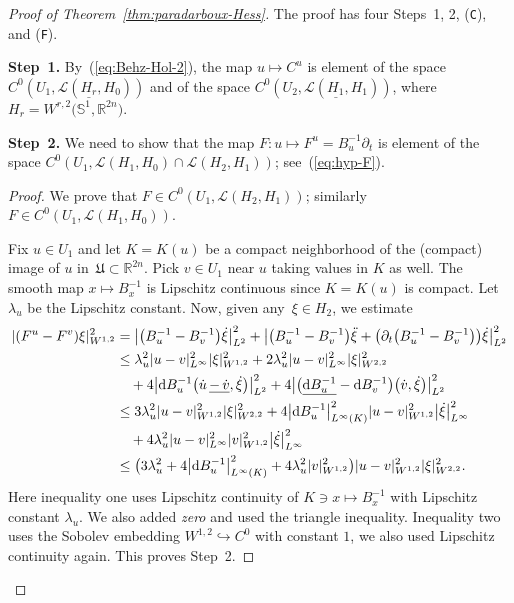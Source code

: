 \documentclass[pdftex]{sigma}
\numberwithin{equation}{section}
\newcommand{\R}{{\mathbb{R}}}
\renewcommand{\SS}{{\mathbb{S}}}
\newcommand{\Ll}{{\mathcal{L}}} %
\def\abs#1{\mathopen|#1\mathclose|}
\newcommand{\p}{{\partial}}
\newcommand{\INTO}{\hookrightarrow} %
\newcommand{\1}{{{\mathchoice {\rm 1\mskip-4mu l} {\rm 1\mskip-4mu l}
{\rm 1\mskip-4.5mu l} {\rm 1\mskip-5mu l}}}}
\begin{document}
\begin{proof}[Proof of Theorem~\ref{thm:paradarboux-Hess}]
The proof has four Steps~1, 2, (\texttt{C}), and (\texttt{F}).

\medskip\noindent
\textbf{Step~1.}
By~(\ref{eq:Behz-Hol-2}),
the map $u\mapsto C^u$ is element of the space
$C^0(U_1,\Ll(\underline{H_r},H_0))$ and of the space
$C^0(U_2,\Ll(\underline{H_1},H_1))$,
where $H_r=W^{r,2}\bigl(\SS^1,\R^{2n}\bigr)$.


\medskip\noindent
\textbf{Step~2.}
We need to show that the map $F\colon u\mapsto F^u=B_u^{-1}\p_t$
is element of the space $C^0(U_1,\Ll(H_1,H_0)\cap\Ll(H_2,H_1))$;
see~(\ref{eq:hyp-F}).

\begin{proof}
We prove that $F\in C^0(U_1,\Ll(H_2,H_1))$;
similarly $F\in C^0(U_1,\Ll(H_1,H_0))$.

Fix $u\in U_1$ and let $K=K(u)$ be a compact neighborhood
of the (compact) image of $u$ in~${\mathfrak{U}\subset\R^{2n}}$.
Pick $v\in U_1$ near $u$ taking values in $K$ as well.
The smooth map $x\mapsto B_x^{-1}$ is Lipschitz continuous
since $K=K(u)$ is compact. Let $\lambda_u$ be the Lipschitz constant.
Now, given any~${\xi\in H_2}$, we estimate
\begin{equation*}
\begin{split}
 \abs{(F^u-F^v)\xi}_{W^{1,2}}^2
 &=\bigl|\bigl(B_u^{-1}-B_v^{-1}\bigr)\dot\xi\bigr|_{L^2}^2
 +\bigl|
 \bigl(B_u^{-1}-B_v^{-1}\bigr)\ddot\xi
 +\bigl(\p_t\bigl(B_u^{-1}-B_v^{-1}\bigr)\bigr)\dot\xi
 \bigr|_{L^2}^2
\\
 &\le\lambda_u^2\abs{u-v}_{L^\infty}^2\abs{\xi}_{W^{1,2}}^2
 +2\lambda_u^2\abs{u-v}_{L^\infty}^2\abs{\xi}_{W^{2,2}}^2
 \\
 &\quad{}
 +4 \bigl|{\rm d}B_u^{-1}\bigl(\dot u\,\underline{-\,\dot v},\dot\xi\bigr)\bigr|_{L^2}^2
 +4 \bigl|\bigl(\underline{{\rm d}B_u^{-1}}-{\rm d}B_v^{-1}\bigr)\bigl(\dot v,\dot\xi\bigr)\bigr|_{L^2}^2
\\
 &\le3\lambda_u^2\abs{u-v}_{W^{1,2}}^2\abs{\xi}_{W^{2,2}}^2
 +4\bigl|{\rm d}B_u^{-1}\bigr|_{L^\infty(K)}^2\abs{u-v}_{W^{1,2}}^2\bigl|\dot\xi\bigr|_{L^\infty}^2
 \\
 &\quad{}
 +4\lambda_u^2\abs{u-v}_{L^\infty}^2\abs{v}_{W^{1,2}}^2\bigl|\dot\xi\bigr|_{L^\infty}^2
\\
 &\le\bigl(3\lambda_u^2+4\bigl|{\rm d}B_u^{-1}\bigr|_{L^\infty(K)}^2
 +4\lambda_u^2 \abs{v}_{W^{1,2}}^2\bigr)
 \abs{u-v}_{W^{1,2}}^2 \abs{\xi}_{W^{2,2}}^2.
\end{split}
\end{equation*}
Here inequality one uses Lipschitz continuity of $K\ni x\mapsto B_x^{-1}$
with Lipschitz constant $\lambda_u$. We also added \textit{zero}
and used the triangle inequality.
Inequality two uses the Sobolev embedding $W^{1,2}\INTO C^0$ with
constant $1$, we also used Lipschitz continuity again.
This proves Step~2.
\end{proof}



\end{proof}
\end{document}
